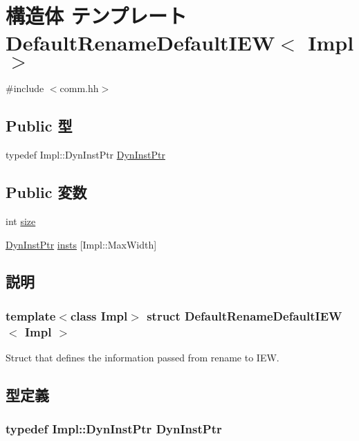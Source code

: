 \hypertarget{structDefaultRenameDefaultIEW}{
\section{構造体 テンプレート DefaultRenameDefaultIEW$<$ Impl $>$}
\label{structDefaultRenameDefaultIEW}
}


{\ttfamily \#include $<$comm.hh$>$}\subsection*{Public 型}
\begin{DoxyCompactItemize}
\item 
typedef Impl::DynInstPtr \hyperlink{structDefaultRenameDefaultIEW_a028ce10889c5f6450239d9e9a7347976}{DynInstPtr}
\end{DoxyCompactItemize}
\subsection*{Public 変数}
\begin{DoxyCompactItemize}
\item 
int \hyperlink{structDefaultRenameDefaultIEW_a439227feff9d7f55384e8780cfc2eb82}{size}
\item 
\hyperlink{structDefaultRenameDefaultIEW_a028ce10889c5f6450239d9e9a7347976}{DynInstPtr} \hyperlink{structDefaultRenameDefaultIEW_a84958be72c3a0ec66109a9483e6c0331}{insts} \mbox{[}Impl::MaxWidth\mbox{]}
\end{DoxyCompactItemize}


\subsection{説明}
\subsubsection*{template$<$class Impl$>$ struct DefaultRenameDefaultIEW$<$ Impl $>$}

Struct that defines the information passed from rename to IEW. 

\subsection{型定義}
\hypertarget{structDefaultRenameDefaultIEW_a028ce10889c5f6450239d9e9a7347976}{
\subsubsection[{DynInstPtr}]{\setlength{\rightskip}{0pt plus 5cm}typedef Impl::DynInstPtr {\bf DynInstPtr}}}
\label{structDefaultRenameDefaultIEW_a028ce10889c5f6450239d9e9a7347976}


